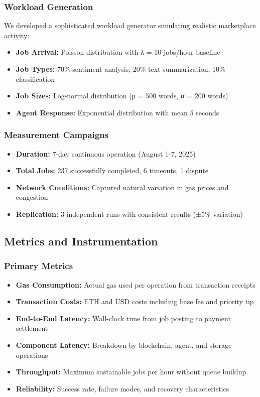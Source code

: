\subsubsection{Workload Generation}
We developed a sophisticated workload generator simulating realistic marketplace activity:
\begin{itemize}
    \item \textbf{Job Arrival:} Poisson distribution with λ = 10 jobs/hour baseline
    \item \textbf{Job Types:} 70\% sentiment analysis, 20\% text summarization, 10\% classification
    \item \textbf{Job Sizes:} Log-normal distribution (μ = 500 words, σ = 200 words)
    \item \textbf{Agent Response:} Exponential distribution with mean 5 seconds
\end{itemize}

\subsubsection{Measurement Campaigns}
\begin{itemize}
    \item \textbf{Duration:} 7-day continuous operation (August 1-7, 2025)
    \item \textbf{Total Jobs:} 237 successfully completed, 6 timeouts, 1 dispute
    \item \textbf{Network Conditions:} Captured natural variation in gas prices and congestion
    \item \textbf{Replication:} 3 independent runs with consistent results (±5\% variation)
\end{itemize}

\subsection{Metrics and Instrumentation}

\subsubsection{Primary Metrics}
\begin{itemize}
    \item \textbf{Gas Consumption:} Actual gas used per operation from transaction receipts
    \item \textbf{Transaction Costs:} ETH and USD costs including base fee and priority tip
    \item \textbf{End-to-End Latency:} Wall-clock time from job posting to payment settlement
    \item \textbf{Component Latency:} Breakdown by blockchain, agent, and storage operations
    \item \textbf{Throughput:} Maximum sustainable jobs per hour without queue buildup
    \item \textbf{Reliability:} Success rate, failure modes, and recovery characteristics
\end{itemize}

